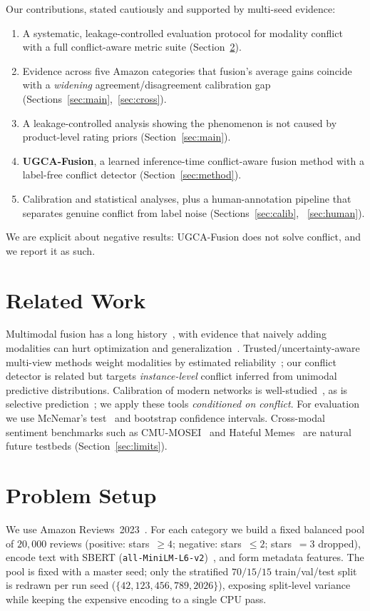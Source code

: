 \documentclass[11pt]{article}
\begin{document}
Our contributions, stated cautiously and supported by multi-seed evidence:
\begin{enumerate}
\item A systematic, leakage-controlled evaluation protocol for modality conflict
with a full conflict-aware metric suite (Section~\ref{sec:setup}).
\item Evidence across five Amazon categories that fusion's average gains coincide
with a \emph{widening} agreement/disagreement calibration gap
(Sections~\ref{sec:main},~\ref{sec:cross}).
\item A leakage-controlled analysis showing the phenomenon is not caused by
product-level rating priors (Section~\ref{sec:main}).
\item \textbf{UGCA-Fusion}, a learned inference-time conflict-aware fusion method
with a label-free conflict detector (Section~\ref{sec:method}).
\item Calibration and statistical analyses, plus a human-annotation pipeline that
separates genuine conflict from label noise (Sections~\ref{sec:calib},
~\ref{sec:human}).
\end{enumerate}

We are explicit about negative results: UGCA-Fusion does not solve conflict, and
we report it as such.

\section{Related Work}
Multimodal fusion has a long history~\citep{baltrusaitis2018multimodal,
zadeh2017tensor}, with evidence that naively adding modalities can hurt
optimization and generalization~\citep{wang2020makes,peng2022balanced}.
Trusted/uncertainty-aware multi-view methods weight modalities by estimated
reliability~\citep{han2021trusted,kendall2018multitask}; our conflict detector is
related but targets \emph{instance-level} conflict inferred from unimodal
predictive distributions. Calibration of modern networks is
well-studied~\citep{guo2017calibration,naeini2015obtaining}, as is selective
prediction~\citep{geifman2017selective}; we apply these tools \emph{conditioned
on conflict}. For evaluation we use McNemar's test~\citep{dietterich1998approximate}
and bootstrap confidence intervals. Cross-modal sentiment benchmarks such as
CMU-MOSEI~\citep{zadeh2018mosei} and Hateful Memes~\citep{kiela2020hateful} are
natural future testbeds (Section~\ref{sec:limits}).

\section{Problem Setup}\label{sec:setup}
We use Amazon Reviews~2023~\citep{hou2024amazon}. For each category we build a
fixed balanced pool of $20{,}000$ reviews (positive: stars~$\ge4$;
negative: stars~$\le2$; stars~$=3$ dropped), encode text with
SBERT (\texttt{all-MiniLM-L6-v2})~\citep{reimers2019sentence}, and form metadata
features. The pool is fixed with a master seed; only the stratified
$70/15/15$ train/val/test split is redrawn per run seed
($\{42,123,456,789,2026\}$), exposing split-level variance while keeping the
expensive encoding to a single CPU pass.
\end{document}
